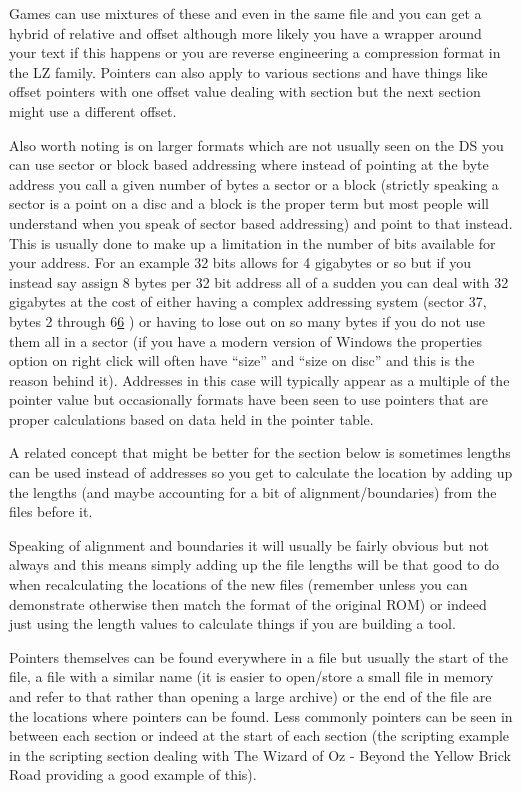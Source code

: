 \documentclass[
]{book}
\begin{document}
Games can use mixtures of these and even in the same file and you can get a hybrid of relative and offset although more likely you have a wrapper around your text if this happens or you are reverse engineering a compression format in the LZ family. Pointers can also apply to various sections and have things like offset pointers with one offset value dealing with section but the next section might use a different offset.

Also worth noting is on larger formats which are not usually seen on the DS you can use sector or block based addressing where instead of pointing at the byte address you call a given number of bytes a sector or a block (strictly speaking a sector is a point on a disc and a block is the proper term but most people will understand when you speak of sector based addressing) and point to that instead. This is usually done to make up a limitation in the number of bits available for your address. For an example 32 bits allows for 4 gigabytes or so but if you instead say assign 8 bytes per 32 bit address all of a sudden you can deal with 32 gigabytes at the cost of either having a complex addressing system (sector 37, bytes 2 through 6\href{romhacking20207.html\#fn6x0}{6} ) or having to lose out on so many bytes if you do not use them all in a sector (if you have a modern version of Windows the properties option on right click will often have ``size'' and ``size on disc'' and this is the reason behind it). Addresses in this case will typically appear as a multiple of the pointer value but occasionally formats have been seen to use pointers that are proper calculations based on data held in the pointer table.

A related concept that might be better for the section below is sometimes lengths can be used instead of addresses so you get to calculate the location by adding up the lengths (and maybe accounting for a bit of alignment/boundaries) from the files before it.

Speaking of alignment and boundaries it will usually be fairly obvious but not always and this means simply adding up the file lengths will be that good to do when recalculating the locations of the new files (remember unless you can demonstrate otherwise then match the format of the original ROM) or indeed just using the length values to calculate things if you are building a tool.

Pointers themselves can be found everywhere in a file but usually the start of the file, a file with a similar name (it is easier to open/store a small file in memory and refer to that rather than opening a large archive) or the end of the file are the locations where pointers can be found. Less commonly pointers can be seen in between each section or indeed at the start of each section (the scripting example in the scripting section dealing with The Wizard of Oz - Beyond the Yellow Brick Road providing a good example of this).
\end{document}
